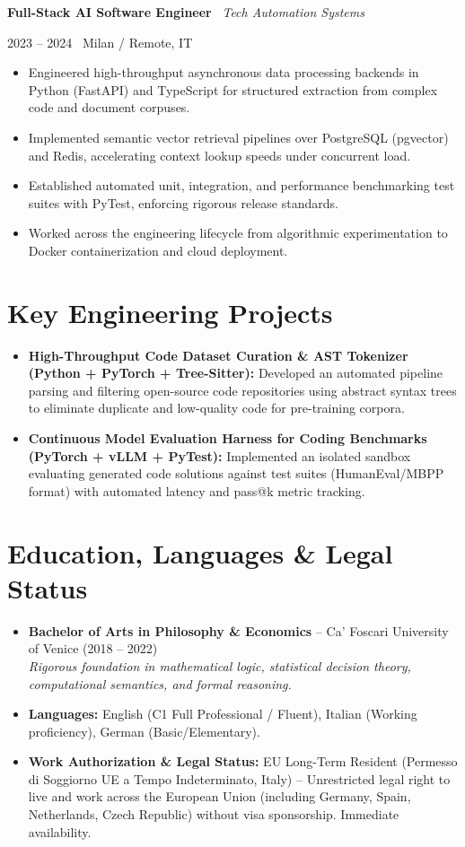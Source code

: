 \documentclass[a4paper,10pt]{article}
\newcommand{\role}[4]{%
  \vspace{2pt}\noindent
  \begin{minipage}[t]{0.70\textwidth}\raggedright\textbf{#1} \textbullet\ \textit{#3}\end{minipage}%
  \hfill
  \begin{minipage}[t]{0.28\textwidth}\raggedleft\footnotesize\color{gray}#2 \textbullet\ #4\end{minipage}%
  \vspace{1pt}%
}
\begin{document}
\vspace{3pt}
\role{Full-Stack AI Software Engineer}{2023 -- 2024}{Tech Automation Systems}{Milan / Remote, IT}
\begin{itemize}
  \item Engineered high-throughput asynchronous data processing backends in Python (FastAPI) and TypeScript for structured extraction from complex code and document corpuses.
  \item Implemented semantic vector retrieval pipelines over PostgreSQL (pgvector) and Redis, accelerating context lookup speeds under concurrent load.
  \item Established automated unit, integration, and performance benchmarking test suites with PyTest, enforcing rigorous release standards.
  \item Worked across the engineering lifecycle from algorithmic experimentation to Docker containerization and cloud deployment.
\end{itemize}

\section{Key Engineering Projects}
\begin{itemize}
  \item \textbf{High-Throughput Code Dataset Curation \& AST Tokenizer (Python + PyTorch + Tree-Sitter):} Developed an automated pipeline parsing and filtering open-source code repositories using abstract syntax trees to eliminate duplicate and low-quality code for pre-training corpora.
  \item \textbf{Continuous Model Evaluation Harness for Coding Benchmarks (PyTorch + vLLM + PyTest):} Implemented an isolated sandbox evaluating generated code solutions against test suites (HumanEval/MBPP format) with automated latency and pass@k metric tracking.
\end{itemize}

\section{Education, Languages \& Legal Status}
\begin{itemize}
  \item \textbf{Bachelor of Arts in Philosophy \& Economics} -- Ca' Foscari University of Venice (2018 -- 2022) \\
  \textit{Rigorous foundation in mathematical logic, statistical decision theory, computational semantics, and formal reasoning.}
  \item \textbf{Languages:} English (C1 Full Professional / Fluent), Italian (Working proficiency), German (Basic/Elementary).
  \item \textbf{Work Authorization \& Legal Status:} EU Long-Term Resident (Permesso di Soggiorno UE a Tempo Indeterminato, Italy) -- Unrestricted legal right to live and work across the European Union (including Germany, Spain, Netherlands, Czech Republic) without visa sponsorship. Immediate availability.
\end{itemize}
\end{document}
